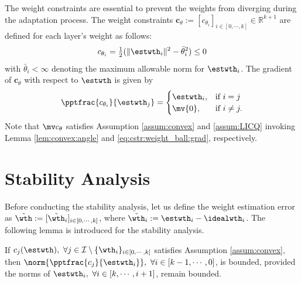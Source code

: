 \documentclass[lettersize,journal]{IEEEtran}
\begin{document}
The weight constraints are essential to prevent the weights from diverging during the adaptation process.
The weight constraints $\boldsymbol{c}_{\theta}:= [c_{\theta_i}]_{i\in[0,\cdots ,k]}\in\mathbb R^{k+1}$ are defined for each layer's weight as follows:
\begin{equation}
    c_{\theta_i}
    =
    \tfrac{1}{2}
    (
        \Vert \estwth_i\Vert^2 
        -
        \bar\theta_i^2 
    )    
    \le 0
    \label{eq:cstr:weight_ball}
\end{equation}
with $\bar\theta_i<\infty$ denoting the maximum allowable norm for $\estwth_i$. 
The gradient of $\boldsymbol{c}_\theta$ with respect to $\estwth$ is given by
\begin{equation}
    \pptfrac{c_{\theta_i}}{\estwth_j} 
    =
    \begin{cases}
        \estwth_i,
        &
        \text{if } i=j
        \\
        \mv{0},
        &
        \text{if } i\ne j
        .
    \end{cases} 
    \label{eq:cstr:weight_ball:grad}
\end{equation}
Note that $\mv c_{\theta}$ satisfies Assumption \ref{assum:convex} and \ref{assum:LICQ} invoking Lemma \ref{lem:convex:angle} and \eqref{eq:cstr:weight_ball:grad}, respectively.

\section{Stability Analysis}\label{sec:stability}

Before conducting the stability analysis, let us define the weight estimation error as $\tilde\wth:= [\tilde\wth_i]_{i\in[0,\cdots,k]}$, where $\tilde\wth_i:=\estwth_i-\idealwth_i$.
The following lemma is introduced for the stability analysis.

\begin{lem} 
    If $c_j(\estwth),\ \forall j\in\mathcal I \setminus \{\wth_i\}_{i\in[0,\cdots,k]}$ satisfies Assumption \ref{assum:convex}, then $\norm{\pptfrac{c_j}{\estwth_i}},\ \forall i\in[k-1,\cdots, 0]$, is bounded, provided the norms of $\estwth_i,\ \forall i\in[k,\cdots, i+1]$, remain bounded.
    \label{lem:cstr:grad:bound}
\end{lem}
\end{document}
